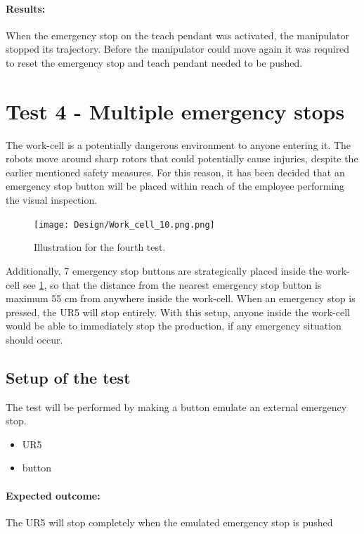 \paragraph{Results: }
When the emergency stop on the teach pendant was activated, the manipulator stopped its trajectory. Before the manipulator could move again it was required to reset the emergency stop and teach pendant needed to be pushed.\\

\section{Test 4 - Multiple emergency stops}
The work-cell is a potentially dangerous environment to anyone entering it. The robots move around sharp rotors that could potentially cause injuries, despite the earlier mentioned safety measures. For this reason, it has been decided that an emergency stop button will be placed within reach of the employee performing the visual inspection.
\begin{figure}[H]
    \centering
    \texttt{[image: Design/Work\_cell\_10.png.png]}
    \caption{Illustration for the fourth test.}
    \label{fig:fourthtest}
\end{figure}
Additionally, 7 emergency stop buttons are strategically placed inside the work-cell see \ref{fig:fourthtest}, so that the distance from the nearest emergency stop button is maximum 55 cm from anywhere inside the work-cell. When an emergency stop is pressed, the UR5 will stop entirely. With this setup, anyone inside the work-cell would be able to immediately stop the production, if any emergency situation should occur. \\
\subsection{Setup of the test}
The test will be performed by making a button emulate an external emergency stop.

 \begin{itemize}
     \item UR5
     \item button
 \end{itemize}
 
 \paragraph{Expected outcome:}
The UR5 will stop completely when the emulated emergency stop is pushed

